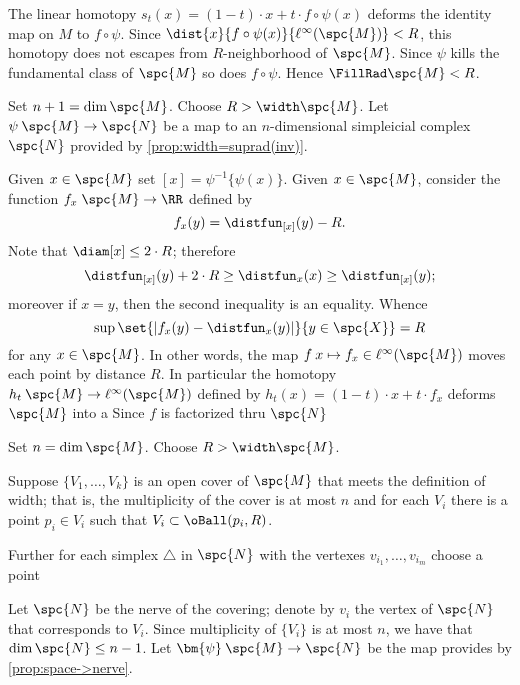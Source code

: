 The linear homotopy $s_t(x)=(1-t)\cdot x+t\cdot f\circ\psi(x)$ deforms the identity map on $M$ to $f\circ\psi$.
Since $\dist{x}{f\circ\psi(x)}{\ell^\infty( \spc{M})}< R$,
this homotopy does not escapes from $R$-neighborhood of $\spc{M}$.
Since $\psi$ kills the fundamental class of $\spc{M}$ so does $f\circ\psi$.
Hence $\FillRad \spc{M}<R$.











Set $n+1=\dim \spc{M}$.
Choose $R>\width\spc{M}$.
Let $\psi\:\spc{M}\to \spc{N}$ be a map to an $n$-dimensional simpleicial complex $\spc{N}$ provided by \ref{prop:width=suprad(inv)}.

Given $x\in \spc{M}$ set $[x]=\psi^{-1}\{\psi(x)\}$.
Given $x\in \spc{M}$, consider the function $f_x\;\spc{M}\to\RR$ defined by
\[f_x(y)=\distfun_{[x]}(y)-R.\]
Note that $\diam [x]\le 2\cdot R$; therefore
\[\distfun_{[x]}(y)+2\cdot R\ge\distfun_x(x)\ge \distfun_{[x]}(y);\]
moreover if $x=y$, then the second inequality is an equality.
Whence \[\sup\set{|f_x(y)-\distfun_x(y)|}{y\in\spc{X}}=R\] 
for any $x\in \spc{M}$.
In other words, the map $f\:x\mapsto f_x\in\ell^\infty(\spc{M})$ moves each point by distance $R$.
In particular the homotopy $h_t\:\spc{M}\to\ell^\infty(\spc{M})$ 
defined by $h_t(x)=(1-t)\cdot x+ t\cdot f_x$ deforms $\spc{M}$ into a 
Since $f$ is factorized thru $\spc{N}$



Set $n=\dim \spc{M}$.
Choose $R>\width\spc{M}$.

Suppose $\{V_1,\dots, V_k\}$ is an open cover of $\spc{M}$ that meets the definition of width;
that is, the multiplicity of the cover is at most $n$ and for each $V_i$ there is a point $p_i\in  V_i$ such that $V_i\subset \oBall(p_i,R)$.

Further for each simplex $\triangle$ in $\spc{N}$ with the vertexes $v_{i_1},\dots,v_{i_m}$ choose a point 

Let $\spc{N}$ be the nerve of the covering;
denote by $v_i$ the vertex of $\spc{N}$ that corresponds to $V_i$.
Since multiplicity of $\{V_i\}$ is at most $n$, we have that $\dim\spc{N}\le n-1$. 
Let $\bm{\psi}\:\spc{M}\to\spc{N}$ be the map provides by \ref{prop:space->nerve}.

